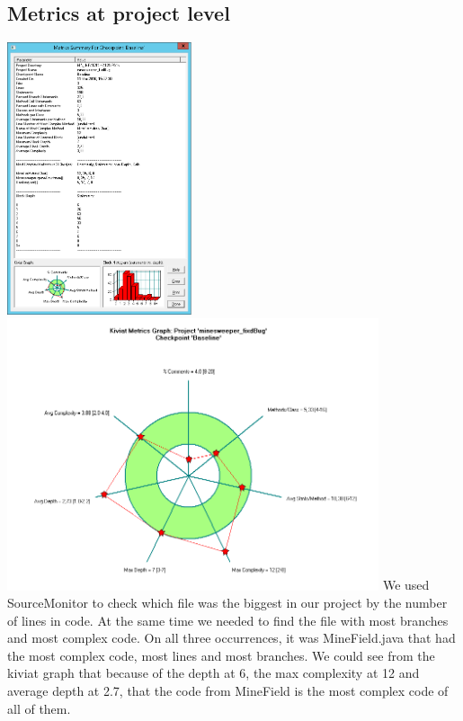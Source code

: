 \documentclass[UKenglish]{article}  %
\begin{document}
\subsection{Metrics at project level}
\includegraphics[height=8cm]{metric_summary}
\includegraphics[height=8cm]{kiviat_diagram_baseline} We used SourceMonitor to
check which file was the biggest in our project by the number of lines in code.
At the same time we needed to find the file with most branches and most complex
code. On all three occurrences, it was MineField.java that had the most complex
code, most lines and most branches. We could see from the kiviat graph that
because of the depth at 6, the max complexity at 12 and average depth at 2.7,
that the code from MineField is the most complex code of all of them.
\end{document}
